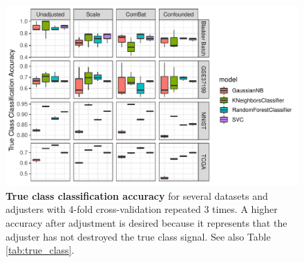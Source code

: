\documentclass[11pt]{article}
\begin{document}
\begin{figure}
	\centering
	\includegraphics[width=\columnwidth]{figures/final/true_class_accuracy.pdf}
	\caption[True class classification accuracy]{\textbf{True class classification accuracy} for several datasets and adjusters with 4-fold cross-validation repeated 3 times. A higher accuracy after adjustment is desired because it represents that the adjuster has not destroyed the true class signal.
	See also Table \ref{tab:true_class}.}
	\label{fig:true_class}
\end{figure}
\begin{table}
	\centering
	
	\caption[True class classification accuracy]{
		\textbf{True class classification accuracy} for several datasets and adjusters.
		After adjustment by the ideal batch adjuster, all true class signal should be preserved, and all classifiers should therefore have the same accuracy in predicting true class before and after adjustment.
		See also \figurename{} \ref{fig:true_class}.
	}
	\label{tab:true_class}
\end{table}
\end{document}
